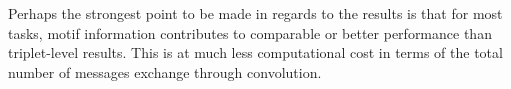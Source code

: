 \documentclass[10pt,a4paper]{article}
\begin{document}






Perhaps the strongest point to be made in regards to the results is that for most tasks, motif information contributes to comparable or better performance than triplet-level results. This is at much less computational cost in terms of the total number of messages exchange through convolution. 
\end{document}

